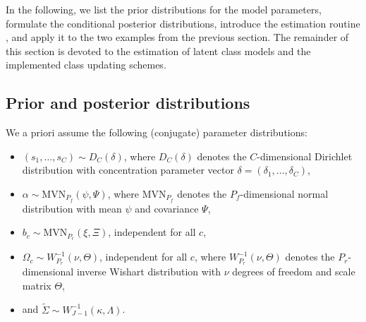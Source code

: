 \documentclass[article,shortnames]{jss}
\newcommand{\fct}[1]{\code{#1()}}
\begin{document}
In the following, we list the prior distributions for the model parameters, formulate the conditional posterior distributions, introduce the estimation routine \fct{fit\_model}, and apply it to the two examples from the previous section. The remainder of this section is devoted to the estimation of latent class models and the implemented class updating schemes.

\subsection{Prior and posterior distributions} \label{subsec:prior_and_posterior}

We a priori assume the following (conjugate) parameter distributions:
\begin{itemize}
  \item $(s_1,\dots,s_C)\sim D_C(\delta)$, where $D_C(\delta)$ denotes the $C$-dimensional Dirichlet distribution with concentration parameter vector $\delta = (\delta_1,\dots,\delta_C)$,
  \item $\alpha\sim \text{MVN}_{P_f}(\psi,\Psi)$, where $\text{MVN}_{P_f}$ denotes the $P_f$-dimensional normal distribution with mean $\psi$ and covariance $\Psi$,
  \item $b_c \sim \text{MVN}_{P_r}(\xi,\Xi)$, independent for all $c$,
  \item $\Omega_c \sim W^{-1}_{P_r}(\nu,\Theta)$, independent for all $c$, where $W^{-1}_{P_r}(\nu,\Theta)$ denotes the $P_r$-dimensional inverse Wishart distribution with $\nu$ degrees of freedom and scale matrix $\Theta$,
  \item and $\tilde{\Sigma} \sim W^{-1}_{J-1}(\kappa,\Lambda)$.
\end{itemize}
\end{document}

